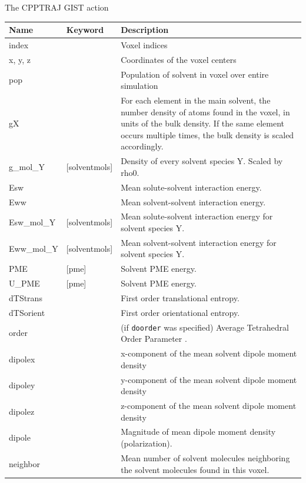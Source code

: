 \documentclass[9pt,tutorial,pubversion]{livecoms}
\newcommand\inlinecode{\texttt}
\begin{document}
\begin{Checklists*}[h!]
\begin{checklist}{The CPPTRAJ GIST action}
\begin{tabularx}{\textwidth}{@{}l l X@{}}
\toprule
Name & Keyword & Description\\
\midrule
index & & Voxel indices \\
x, y, z & & Coordinates of the voxel centers \\
pop & & Population of solvent in voxel over entire simulation \\
gX &  & For each element in the main solvent, the number density of atoms found in the voxel, in units of the bulk density. If the same element occurs multiple times, the bulk density is scaled accordingly. \\
g\_mol\_Y & [solventmols]  & Density of every solvent species Y. Scaled by rho0. \\
Esw &  &  Mean solute-solvent interaction energy. \\
Eww &  & Mean solvent-solvent interaction energy. \\
Esw\_mol\_Y & [solventmols]  &  Mean solute-solvent interaction energy for solvent species Y. \\
Eww\_mol\_Y & [solventmols]  & Mean solvent-solvent interaction energy for solvent species Y. \\
PME & [pme] & Solvent PME energy. \\
U\_PME & [pme] & Solvent PME energy. \\
dTStrans &  & First order translational entropy. \\
dTSorient &  & First order orientational entropy. \\
order &  & (if \inlinecode{doorder} was specified) Average Tetrahedral Order Parameter \cite{chatterjee2008computational}. \\
dipolex &  & x-component of the mean solvent dipole moment density \\
dipoley &  & y-component of the mean solvent dipole moment density \\
dipolez &  & z-component of the mean solvent dipole moment density \\
dipole &  & Magnitude of mean dipole moment density (polarization). \\
neighbor &  & Mean number of solvent molecules neighboring the solvent molecules found in this voxel. \\

\end{tabularx}
\end{checklist}
\end{Checklists*}
\end{document}
